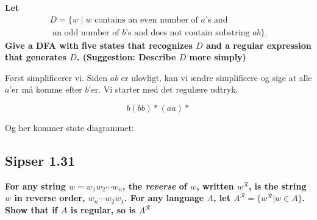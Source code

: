 \textbf{Let}
\begin{align*}
  D = \{w\; | \; w \text{ contains an even number of } a \text{'s and}\\ \text{ an odd number of }b \text{'s and does not contain substring }ab\}.
\end{align*}
\textbf{Give a DFA with five states that recognizes $D$ and a regular expression that generates $D$. (Suggestion: Describe $D$ more simply)}

Først simplificerer vi. Siden $ab$ er ulovligt, kan vi ændre simplificere og sige at alle $a$'er må komme efter $b$'er.
Vi starter med det regulære udtryk.

\begin{equation*}
b(bb)*(aa)*
\end{equation*}

Og her kommer state diagrammet:

\begin{center}
\end{center}

\subsection*{Sipser 1.31}%
\label{subsec:sipser1.31}

\textbf{For any string $w = w_{1}w_{2} \cdots w_{n}$, the \textit{reverse} of $w$, written $w^{\mathcal{R}}$, is the string $w$ in reverse order, $w_{n} \cdots w_{2}w_{1}$. For any language $A$, let $A^{\mathcal{R}} = \{w^{\mathcal{R}} | w \in A\}$. Show that if $A$ is regular, so is $A^{\mathcal{R}}$}

